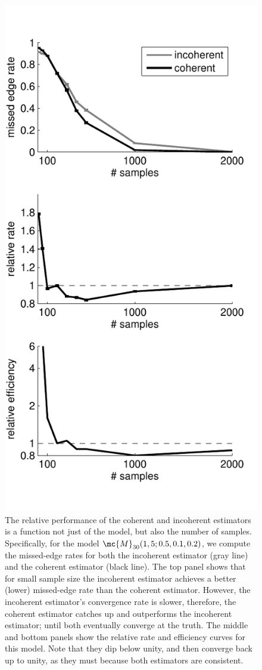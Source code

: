 \documentclass[10pt,journal,cspaper,compsoc]{IEEEtran}
\begin{document}
\begin{figure}[htbp]
	\centering
		\includegraphics[width=0.8\linewidth]{../figs/RE_V30_s5_p10_q20.pdf}
	\caption{The relative performance of the coherent and incoherent estimators is a function not just of the model, but also the number of samples.  Specifically, for the model $\mc{M}_{30}(1,5;0.5,0.1,0.2)$, we compute the missed-edge rates for both the incoherent estimator (gray line) and the coherent estimator (black line).  The top panel shows that for small sample size the incoherent estimator achieves a better (lower) missed-edge rate than the coherent estimator. However, the incoherent estimator's convergence rate is slower, therefore, the coherent estimator catches up and outperforms the incoherent estimator; until both eventually converge at the truth.  The middle and bottom panels show the relative rate and efficiency curves for this model. Note that they dip below unity, and then converge back up to unity, as they must because both estimators are consistent. }
	\label{fig:RE}
\end{figure}
\end{document}
